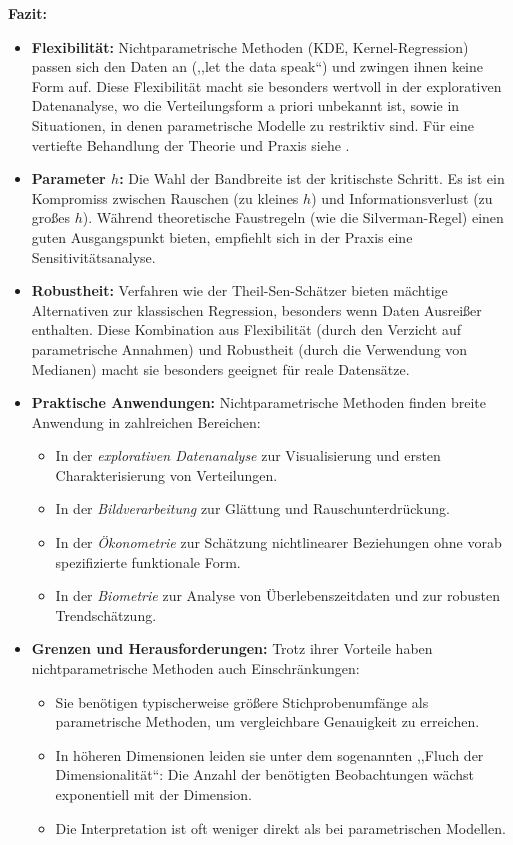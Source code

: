 \documentclass[a4paper, 11pt]{scrartcl}
\begin{document}
\textbf{Fazit:}
\begin{itemize}
	\item \textbf{Flexibilität:} Nichtparametrische Methoden (KDE, Kernel-Regression) passen sich den Daten an (,,let the data speak``) und zwingen ihnen keine Form auf. Diese Flexibilität macht sie besonders wertvoll in der explorativen Datenanalyse, wo die Verteilungsform a priori unbekannt ist, sowie in Situationen, in denen parametrische Modelle zu restriktiv sind. Für eine vertiefte Behandlung der Theorie und Praxis siehe \cite{Silverman1986, Wand1995, Scott1992}.

	\item \textbf{Parameter $h$:} Die Wahl der Bandbreite ist der kritischste Schritt. Es ist ein Kompromiss zwischen Rauschen (zu kleines $h$) und Informationsverlust (zu großes $h$). Während theoretische Faustregeln (wie die Silverman-Regel) einen guten Ausgangspunkt bieten, empfiehlt sich in der Praxis eine Sensitivitätsanalyse.

	\item \textbf{Robustheit:} Verfahren wie der Theil-Sen-Schätzer bieten mächtige Alternativen zur klassischen Regression, besonders wenn Daten Ausreißer enthalten. Diese Kombination aus Flexibilität (durch den Verzicht auf parametrische Annahmen) und Robustheit (durch die Verwendung von Medianen) macht sie besonders geeignet für reale Datensätze.

	\item \textbf{Praktische Anwendungen:} Nichtparametrische Methoden finden breite Anwendung in zahlreichen Bereichen:
	      \begin{itemize}
	      	\item In der \textit{explorativen Datenanalyse} zur Visualisierung und ersten Charakterisierung von Verteilungen.
	      	\item In der \textit{Bildverarbeitung} zur Glättung und Rauschunterdrückung.
	      	\item In der \textit{Ökonometrie} zur Schätzung nichtlinearer Beziehungen ohne vorab spezifizierte funktionale Form.
	      	\item In der \textit{Biometrie} zur Analyse von Überlebenszeitdaten und zur robusten Trendschätzung.
	      \end{itemize}

	\item \textbf{Grenzen und Herausforderungen:} Trotz ihrer Vorteile haben nichtparametrische Methoden auch Einschränkungen:
	      \begin{itemize}
	      	\item Sie benötigen typischerweise größere Stichprobenumfänge als parametrische Methoden, um vergleichbare Genauigkeit zu erreichen.
	      	\item In höheren Dimensionen leiden sie unter dem sogenannten ,,Fluch der Dimensionalität``: Die Anzahl der benötigten Beobachtungen wächst exponentiell mit der Dimension.
	      	\item Die Interpretation ist oft weniger direkt als bei parametrischen Modellen.
	      \end{itemize}


\end{itemize}
\end{document}
